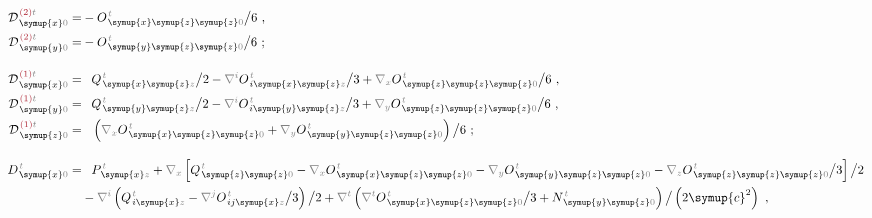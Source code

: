 \begin{subequations} \label{eq:D^(2-0)_0=}
\begin{align}
	{\mathcal{D}}^{\;\!\textcolor{Maroon}{(2)}\mathcolor{gray}{t}}_{\;\! \symup{x} \mathcolor{gray}{0}} = &- O^{\;\!\mathcolor{gray}{t}}_{\;\! \symup{x}\symup{z}\symup{z}\mathcolor{gray}{0}} \big/ 6~, \label{eq:D^(2)_x0=} \\
	{\mathcal{D}}^{\;\!\textcolor{Maroon}{(2)}\mathcolor{gray}{t}}_{\;\! \symup{y} \mathcolor{gray}{0}} = &- O^{\;\!\mathcolor{gray}{t}}_{\;\! \symup{y}\symup{z}\symup{z}\mathcolor{gray}{0}} \big/ 6~; \label{eq:D^(2)_y0=} \\[1.0em]
	{\mathcal{D}}^{\;\!\textcolor{Maroon}{(1)}\mathcolor{gray}{t}}_{\;\! \symup{x} \mathcolor{gray}{0}} = &\hphantom{+} Q^{\;\!\mathcolor{gray}{t}}_{\;\! \symup{x}\symup{z}\mathcolor{gray}{z}} \big/ 2 - \mathcolor{gray}{\nabla^i} O^{\;\!\mathcolor{gray}{t}}_{\;\! i\symup{x}\symup{z}\mathcolor{gray}{z}} \big/ 3 + \mathcolor{gray}{\nabla_x} O^{\;\!\mathcolor{gray}{t}}_{\;\! \symup{z}\symup{z}\symup{z}\mathcolor{gray}{0}} \big/ 6~, \label{eq:D^(1)_x0=} \\
	{\mathcal{D}}^{\;\!\textcolor{Maroon}{(1)}\mathcolor{gray}{t}}_{\;\! \symup{y} \mathcolor{gray}{0}} = &\hphantom{+} Q^{\;\!\mathcolor{gray}{t}}_{\;\! \symup{y}\symup{z}\mathcolor{gray}{z}} \big/ 2 - \mathcolor{gray}{\nabla^i} O^{\;\!\mathcolor{gray}{t}}_{\;\! i\symup{y}\symup{z}\mathcolor{gray}{z}} \big/ 3 + \mathcolor{gray}{\nabla_y} O^{\;\!\mathcolor{gray}{t}}_{\;\! \symup{z}\symup{z}\symup{z}\mathcolor{gray}{0}} \big/ 6~, \label{eq:D^(1)_y0=} \\
	{\mathcal{D}}^{\;\!\textcolor{Maroon}{(1)}\mathcolor{gray}{t}}_{\;\! \symup{z} \mathcolor{gray}{0}} = &\hphantom{+} \left( \mathcolor{gray}{\nabla_x} O^{\;\!\mathcolor{gray}{t}}_{\;\! \symup{x} \symup{z} \symup{z} \mathcolor{gray}{0}} + \mathcolor{gray}{\nabla_y} O^{\;\!\mathcolor{gray}{t}}_{\;\! \symup{y} \symup{z} \symup{z} \mathcolor{gray}{0}} \right) \big/ 6~; \label{eq:D^(1)_z0=} \\[1.0em]
	D^{\;\!\mathcolor{gray}{t}}_{\;\! \symup{x}\mathcolor{gray}{0}} = &\hphantom{+} P^{\;\!\mathcolor{gray}{t}}_{\;\! \symup{x}\mathcolor{gray}{z}} + \mathcolor{gray}{\nabla_x} \left[ Q^{\;\!\mathcolor{gray}{t}}_{\;\! \symup{z} \symup{z} \mathcolor{gray}{0}} - \mathcolor{gray}{\nabla_x} O^{\;\!\mathcolor{gray}{t}}_{\;\! \symup{x} \symup{z} \symup{z} \mathcolor{gray}{0}} - \mathcolor{gray}{\nabla_y}  O^{\;\!\mathcolor{gray}{t}}_{\;\! \symup{y} \symup{z} \symup{z}  \mathcolor{gray}{0}} - \mathcolor{gray}{\nabla_z}  O^{\;\!\mathcolor{gray}{t}}_{\;\! \symup{z} \symup{z} \symup{z} \mathcolor{gray}{0}} \big/ 3 \right] \big/ 2 \label{eq:D_x0=} \\ &- \mathcolor{gray}{\nabla^i} \left( Q^{\;\!\mathcolor{gray}{t}}_{\;\! i\symup{x}\mathcolor{gray}{z}} - \mathcolor{gray}{\nabla^j} O^{\;\!\mathcolor{gray}{t}}_{\;\! ij\symup{x}\mathcolor{gray}{z}} \big/ 3 \right) \big/ 2 + \mathcolor{gray}{\nabla^t} \left( \mathcolor{gray}{\nabla^t} O^{\;\!\mathcolor{gray}{t}}_{\;\!\symup{x} \symup{z} \symup{z} \mathcolor{gray}{0}} \big/ 3 + N^{\;\!\mathcolor{gray}{t}}_{\;\! \symup{y} \symup{z} \mathcolor{gray}{0}} \right) \big/ \left( 2 \symup{c}^2 \right) ~, \\ 

\end{align}
\end{subequations}
